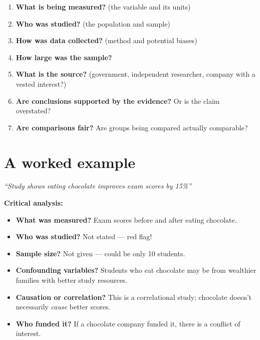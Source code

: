 \documentclass[
  11pt,
  a4paper,
  oneside,
  open=any]{scrbook}
\providecommand{\tightlist}{%
  \setlength{\itemsep}{0pt}\setlength{\parskip}{0pt}}
\begin{document}
\begin{enumerate}
\def\labelenumi{\arabic{enumi}.}
\tightlist
\item
  \textbf{What is being measured?} (the variable and its units)
\item
  \textbf{Who was studied?} (the population and sample)
\item
  \textbf{How was data collected?} (method and potential biases)
\item
  \textbf{How large was the sample?}
\item
  \textbf{What is the source?} (government, independent researcher,
  company with a vested interest?)
\item
  \textbf{Are conclusions supported by the evidence?} Or is the claim
  overstated?
\item
  \textbf{Are comparisons fair?} Are groups being compared actually
  comparable?
\end{enumerate}

\section{A worked example}\label{a-worked-example}

\begin{tcolorbox}[enhanced jigsaw, breakable, leftrule=.75mm, bottomtitle=1mm, bottomrule=.15mm, titlerule=0mm, left=2mm, opacitybacktitle=0.6, coltitle=black, colbacktitle=quarto-callout-note-color!10!white, rightrule=.15mm, title=\textcolor{quarto-callout-note-color}{\faInfo}\hspace{0.5em}{News headline}, toptitle=1mm, arc=.35mm, colback=white, toprule=.15mm, colframe=quarto-callout-note-color-frame, opacityback=0]

\emph{``Study shows eating chocolate improves exam scores by 15\%''}

\end{tcolorbox}

\textbf{Critical analysis:}

\begin{itemize}
\tightlist
\item
  \textbf{What was measured?} Exam scores before and after eating
  chocolate.
\item
  \textbf{Who was studied?} Not stated --- red flag!
\item
  \textbf{Sample size?} Not given --- could be only 10 students.
\item
  \textbf{Confounding variables?} Students who eat chocolate may be from
  wealthier families with better study resources.
\item
  \textbf{Causation or correlation?} This is a correlational study;
  chocolate doesn't necessarily \emph{cause} better scores.
\item
  \textbf{Who funded it?} If a chocolate company funded it, there is a
  conflict of interest.
\end{itemize}
\end{document}
